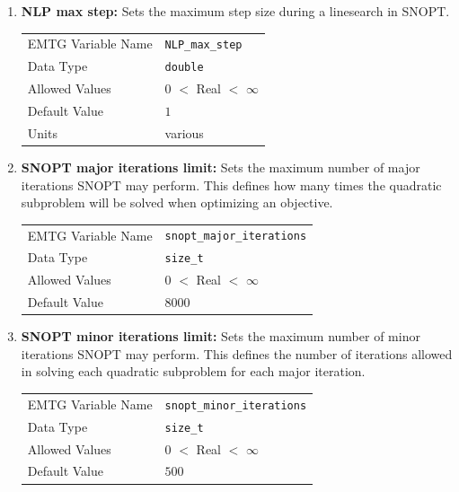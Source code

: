\begin{enumerate}
    \item \textbf{\ac{NLP} max step:} Sets the maximum step size during a linesearch in \ac{SNOPT}.
    \begin{table}[H]
        \hspace{2cm}
        \begin{tabular}{lp{5cm}}
        \ac{EMTG} Variable Name & \verb|NLP_max_step| \\
        Data Type & \verb|double| \\
        Allowed Values & $0$ $<$ Real $<$ $\infty$ \\
        Default Value & $1$ \\
        Units & various
        \end{tabular}
    \end{table}
    
    \item \textbf{\ac{SNOPT} major iterations limit:} Sets the maximum number of major iterations \ac{SNOPT} may perform. This defines how many times the quadratic subproblem will be solved when optimizing an objective.
    \begin{table}[H]
        \hspace{2cm}
        \begin{tabular}{lp{5cm}}
        \ac{EMTG} Variable Name & \verb|snopt_major_iterations| \\
        Data Type & \verb|size_t| \\
        Allowed Values & $0$ $<$ Real $<$ $\infty$ \\
        Default Value & $8000$ \\
        \end{tabular}
    \end{table}
    
    \item \textbf{\ac{SNOPT} minor iterations limit:} Sets the maximum number of minor iterations \ac{SNOPT} may perform. This defines the number of iterations allowed in solving each quadratic subproblem for each major iteration.
    \begin{table}[H]
        \hspace{2cm}
        \begin{tabular}{lp{5cm}}
        \ac{EMTG} Variable Name & \verb|snopt_minor_iterations| \\
        Data Type & \verb|size_t| \\
        Allowed Values & $0$ $<$ Real $<$ $\infty$ \\
        Default Value & $500$ \\
        \end{tabular}
    \end{table}
    

\end{enumerate}
